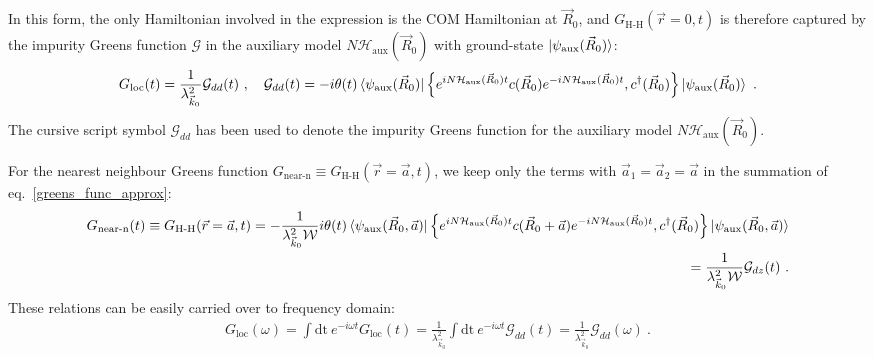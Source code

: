\documentclass[prb]{revtex4-2}
\begin{document}
In this form, the only Hamiltonian involved in the expression is the COM Hamiltonian at \(\vec R_0\), and \(G_\text{H-H}(\vec r=0, t)\) is therefore captured by the impurity Greens function \(\mathcal{G}\) in the auxiliary model \(N \mathcal{H}_\text{aux}(\vec R_0)\) with ground-state \(\ket{\psi_\text{aux}(\vec R_0)}\):
\begin{equation}\begin{aligned}
	\label{greens_func_relation}
	G_\text{loc}(t) = \frac{1}{\lambda_{\vec k_0}^2}\mathcal{G}_{dd}(t)~,\quad \mathcal{G}_{dd}(t) = -i\theta(t) \braket{\psi_\text{aux}(\vec R_0) | \left\{ e^{i N \mathcal{H}_\text{aux}(\vec R_0) t}c(\vec R_0)e^{-i N \mathcal{H}_\text{aux}(\vec R_0) t}, c^\dagger(\vec R_0) \right\} | \psi_\text{aux}(\vec R_0)}~.
\end{aligned}\end{equation}
The cursive script symbol \(\mathcal{G}_{dd}\) has been used to denote the impurity Greens function for the auxiliary model \(N \mathcal{H}_\text{aux}(\vec R_0)\).

For the nearest neighbour Greens function \(G_\text{near-n} \equiv G_\text{H-H}(\vec r=\vec a, t)\), we keep only the terms with \(\vec a_1 = \vec a_2 = \vec a\) in the summation of eq.~\ref{greens_func_approx}:
\begin{equation}\begin{aligned}
	\label{greens_func_relation_near}
	G_\text{near-n}(t) \equiv G_\text{H-H}(\vec r=\vec a, t) = -\frac{1}{\lambda_{\vec k_0}^2 \mathcal{W}}i\theta(t) \braket{\psi_\text{aux}(\vec R_0, \vec a) | \left\{ e^{i N \mathcal{H}_\text{aux}(\vec R_0) t}c(\vec R_0 + \vec a)e^{-i N \mathcal{H}_\text{aux}(\vec R_0) t}, c^\dagger(\vec R_0) \right\} | \psi_\text{aux}(\vec R_0, \vec a)} \\
	= \frac{1}{\lambda_{\vec k_0}^2 \mathcal{W}} \mathcal{G}_{dz}(t)~.
\end{aligned}\end{equation}
These relations can be easily carried over to frequency domain: 
\begin{equation}\begin{aligned}
	G_\text{loc}(\omega) = \int \mathrm{dt}~e^{-i\omega t} G_\text{loc}(t) = \frac{1}{\lambda_{\vec k_0}^2}\int \mathrm{dt}~e^{-i\omega t} \mathcal{G}_{dd}(t) = \frac{1}{\lambda_{\vec k_0}^2} \mathcal{G}_{dd}(\omega)~.
\end{aligned}\end{equation}
\end{document}
